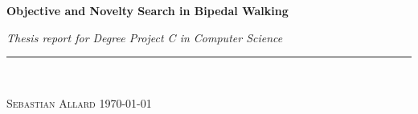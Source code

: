 
\vspace*{5cm}

\begin{flushleft}
\Huge \textsf{\textbf{Objective and Novelty Search in Bipedal Walking}}
\end{flushleft}

\emph{\large Thesis report for Degree Project C in Computer Science} \hfill \\
\rule{\textwidth}{1pt} \\

\begin{flushright}
\textsc{Sebastian Allard} \quad \today
\end{flushright}


\thispagestyle{empty}
